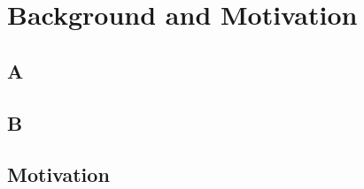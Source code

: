 \section{Background and Motivation}
\label{sec:background}

\subsection{A}

\subsection{B}

\subsection{Motivation}